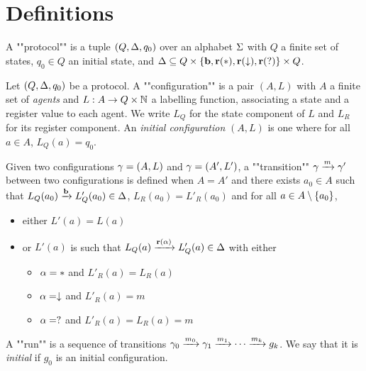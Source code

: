 \section{Definitions}

\begin{definition}
	A ""protocol"" is a tuple $(Q, \D, q_0)$ over an alphabet $\S$ with $Q$ a finite set of states, $q_0 \in Q$ an initial state, and $\D \subseteq Q \times \set{\br, \rec(*), \rec(\cp), \rec(\testeq)} \times Q$.
\end{definition}

\begin{definition}
	Let $(Q,\D, q_0)$ be a protocol.
	A ""configuration"" is a pair $(A, L)$ with $A$ a finite set of \emph{agents}   and $L : A \to Q \times \nats$  a labelling function, associating a state and a register value to each agent. We write $L_Q$ for the state component of $L$ and $L_R$ for its register component.
	An \emph{initial configuration} $(A, L)$ is one where for all $a \in A$, $L_Q(a) = q_0$.
	
	\AP Given two configurations $\g = (A, L)$ and $\g = (A', L')$, a ""transition"" $\g 
	\act{m} \g'$ between two configurations is defined when $A = A'$ and there exists $a_0 \in A$ such that $L_Q(a_0) \act{\br} L'_Q(a_0) \in \D$, $L_R(a_0) = L'_R(a_0)$ and for all $a \in A\setminus \set{a_0}$,  
	\begin{itemize}
		\item either $L'(a) = L(a)$
		
		\item or $L'(a)$ is such that $L_Q(a) \act{\rec(\a)} L'_Q(a) \in \D$ with either
		\begin{itemize}
			\item $\a = *$ and $L'_R(a) = L_{R}(a)$
			\item $\a = \cp$ and $L'_R(a) = m$
			\item $\a = \testeq$ and $L'_R(a) = L_R(a) =m$
		\end{itemize}
	\end{itemize}

	\AP A ""run"" is a sequence of transitions $\g_0 \act{m_0} \g_1 \act{m_1} \cdots \act{m_k} g_k$. We say that it is \emph{initial} if $g_0$ is an initial configuration.
\end{definition}

